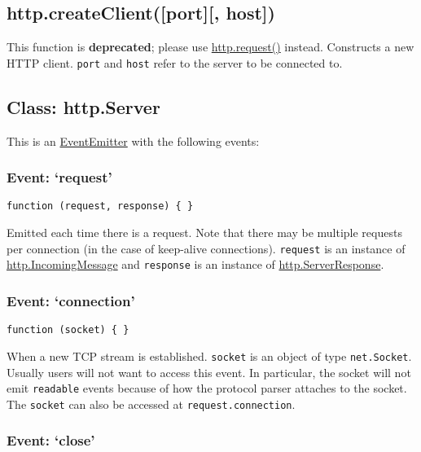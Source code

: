 \subsection{http.createClient({[}port{]}{[},
host{]})}\label{http.createclientport-host}

This function is \textbf{deprecated}; please use
\hyperref[httpux5fhttpux5frequestux5foptionsux5fcallback]{http.request()}
instead. Constructs a new HTTP client. \texttt{port} and \texttt{host}
refer to the server to be connected to.

\subsection{Class: http.Server}\label{class-http.server}

This is an
\href{events.html\#events_class_events_eventemitter}{EventEmitter} with
the following events:

\subsubsection{\texorpdfstring{Event:
`request'}{Event: request}}\label{event-request}

\texttt{function\ (request,\ response)\ \{\ \}}

Emitted each time there is a request. Note that there may be multiple
requests per connection (in the case of keep-alive connections).
\texttt{request} is an instance of
\hyperref[httpux5fhttpux5fincomingmessage]{http.IncomingMessage} and
\texttt{response} is an instance of
\hyperref[httpux5fclassux5fhttpux5fserverresponse]{http.ServerResponse}.

\subsubsection{\texorpdfstring{Event:
`connection'}{Event: connection}}\label{event-connection}

\texttt{function\ (socket)\ \{\ \}}

When a new TCP stream is established. \texttt{socket} is an object of
type \texttt{net.Socket}. Usually users will not want to access this
event. In particular, the socket will not emit \texttt{readable} events
because of how the protocol parser attaches to the socket. The
\texttt{socket} can also be accessed at \texttt{request.connection}.

\subsubsection{\texorpdfstring{Event:
`close'}{Event: close}}\label{event-close}

